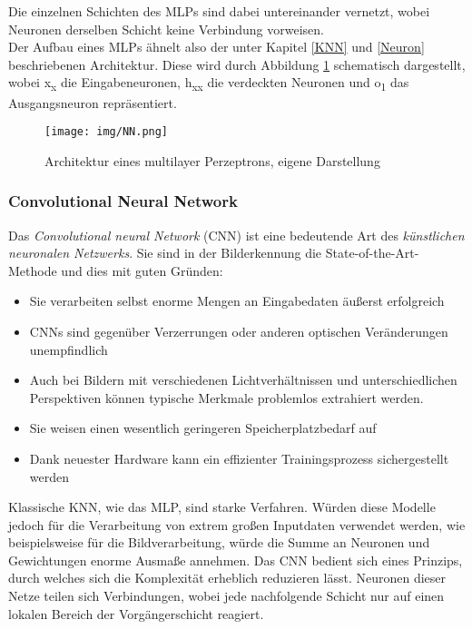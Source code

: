 Die einzelnen Schichten des MLPs sind dabei untereinander vernetzt, wobei Neuronen derselben Schicht keine Verbindung vorweisen.
\cite[vgl.][]{15, 17}  \cite[vgl.][S. 80, S. 144]{13}
\\
Der Aufbau eines MLPs ähnelt also der unter Kapitel \ref{KNN} und \ref{Neuron} beschriebenen Architektur. Diese wird durch Abbildung \ref{fig:Netz} schematisch dargestellt, wobei \glqq x\textsubscript{x}\grqq{} die Eingabeneuronen, \glqq h\textsubscript{xx}\grqq{} die verdeckten Neuronen und \glqq o\textsubscript{1}\grqq{} das Ausgangsneuron repräsentiert.

\begin{figure}[H]
	\centering
	\texttt{[image: img/NN.png]}
	\caption{Architektur eines multilayer Perzeptrons, eigene Darstellung}
	\label{fig:Netz}
\end{figure}


\subsubsection{Convolutional Neural Network}
Das \textit{Convolutional neural Network} (CNN) ist eine bedeutende Art des \textit{künstlichen neuronalen Netzwerks}. Sie \glqq sind in der Bilderkennung die State-of-the-Art-Methode\grqq{} \cite{29} und dies mit guten Gründen:

\begin{itemize}
	\item Sie verarbeiten selbst enorme Mengen an Eingabedaten äußerst erfolgreich
	\item CNNs sind gegenüber Verzerrungen oder anderen optischen Veränderungen unempfindlich
	\item Auch bei Bildern mit verschiedenen Lichtverhältnissen und unterschiedlichen Perspektiven können typische Merkmale problemlos extrahiert werden.
	\item Sie weisen einen wesentlich geringeren Speicherplatzbedarf auf
	\item Dank neuester Hardware kann ein effizienter Trainingsprozess sichergestellt werden
\end{itemize}

Klassische KNN, wie das MLP, sind starke Verfahren. Würden diese Modelle jedoch für die Verarbeitung von extrem großen Inputdaten verwendet werden, wie beispielsweise für die Bildverarbeitung, würde die Summe an Neuronen und Gewichtungen enorme Ausmaße annehmen.
Das CNN bedient sich eines Prinzips, durch welches sich die Komplexität erheblich reduzieren lässt. Neuronen dieser Netze teilen sich Verbindungen, \glqq wobei jede nachfolgende Schicht nur auf einen lokalen Bereich der Vorgängerschicht reagiert\grqq \cite[S. 198]{13}. 

